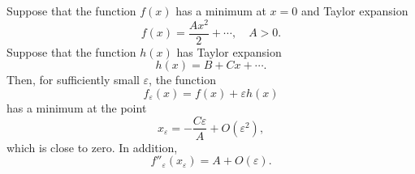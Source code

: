 Suppose that the function $f(x)$ has a minimum at $x = 0$ and Taylor expansion
$$f(x) = \frac{A x^2}{2} + \cdots, \quad A > 0.$$
Suppose that the function $h(x)$ has Taylor expansion
$$h(x) = B + Cx + \cdots.$$
Then, for sufficiently small $\varepsilon$, the function
$$f_\varepsilon(x) = f(x) + \varepsilon h(x)$$
has a minimum at the point
$$x_\varepsilon = -\frac{C \varepsilon}{A} + O(\varepsilon^2),$$
which is close to zero. In addition,
$$f''_\varepsilon(x_\varepsilon) = A + O(\varepsilon).$$
